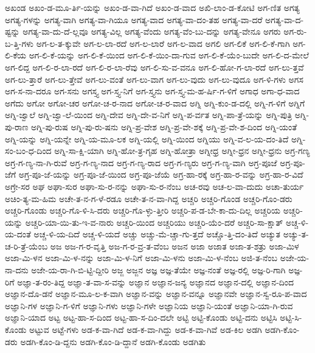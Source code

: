 {ಅಖಂಡ
ಅಖಂ-ಡ-ಮೂ-ರ್ತಿ-ಯನ್ನು
ಅಖಂ-ಡ-ವಾ-ಗಿದೆ
ಅಖಂ-ಡ-ವಾದ
ಅಖಿ-ಲಾಂ-ಡ-ಕೋಟಿ
ಅಗ-ಣಿತ
ಅಗತ್ಯ
ಅಗತ್ಯ-ಗಳನ್ನು
ಅಗತ್ಯ-ವಾಗಿ
ಅಗತ್ಯ-ವಾ-ಗಿಯೂ
ಅಗತ್ಯ-ವಾದ
ಅಗತ್ಯ-ವಾ-ದಂ-ತಹ
ಅಗತ್ಯ-ವಾ-ದರೆ
ಅಗತ್ಯ-ವಾ-ದ-ಷ್ಟನ್ನು
ಅಗತ್ಯ-ವಾ-ದು-ದೆ-ಲ್ಲವೂ
ಅಗತ್ಯ-ವಿಲ್ಲ
ಅಗತ್ಯ-ವೆಂದು
ಅಗತ್ಯ-ವೆಂ-ಬು-ದನ್ನು
ಅಗತ್ಯ-ವೇನೂ
ಅಗರು
ಅಗ-ರು-ಬ-ತ್ತಿ-ಗಳು
ಅಗ-ಲ-ತ-ಕ್ಕುವೇ
ಅಗ-ಲ-ಲಾ-ರದೆ
ಅಗ-ಲ-ಲಾರೆ
ಅಗ-ಲ-ವಾದ
ಅಗಲಿ
ಅಗ-ಲಿಕೆ
ಅಗ-ಲಿ-ಕೆ-ಗಾಗಿ
ಅಗ-ಲಿ-ಕೆಯ
ಅಗ-ಲಿ-ಕೆ-ಯನ್ನು
ಅಗ-ಲಿ-ಕೆ-ಯಿಂದ
ಅಗ-ಲಿ-ಕೆ-ಯಿಂ-ದಾ-ಗುವ
ಅಗ-ಲಿ-ಕೆ-ಯೆಂ-ಬುದೇ
ಅಗ-ಲಿ-ದ-ಮೇಲೆ
ಅಗ-ಲಿದ್ದ
ಅಗ-ಲಿ-ರ-ಲಾ-ರದೆ
ಅಗ-ಲಿ-ರ-ಲಾ-ರೆವು
ಅಗ-ಲಿ-ಸು-ವ-ವನೂ
ಅಗ-ಲಿ-ಹೋ-ಗ-ಲಾ-ರದೆ
ಅಗ-ಲು-ತ್ತವೆ
ಅಗ-ಲು-ತ್ತಾರೆ
ಅಗ-ಲು-ತ್ತೇವೆ
ಅಗ-ಲು-ವಂತೆ
ಅಗ-ಲು-ವಾಗ
ಅಗ-ಲು-ವುದು
ಅಗ-ಲು-ವುದೂ
ಅಗ-ಳಿ-ಗಳು
ಅಗಸ
ಅಗ-ಸ-ನಾ-ದರೂ
ಅಗ-ಸನು
ಅಗಸ್ತ್ಯ
ಅಗ-ಸ್ತ್ಯ-ನಿಗೆ
ಅಗ-ಸ್ತ್ಯನು
ಅಗ-ಸ್ತ್ಯ-ಮ-ಹ-ರ್ಷಿ-ಗ-ಳಿಗೆ
ಅಗಾಧ
ಅಗಾ-ಧ-ವಾದ
ಅಗೆದು
ಅಗೋ
ಅಗೋ-ಚರ
ಅಗೋ-ಚ-ರ-ನಾದ
ಅಗೋ-ಚ-ರ-ವಾದ
ಅಗ್ನಿ
ಅಗ್ನಿ-ಕುಂ-ಡ-ದಲ್ಲಿ
ಅಗ್ನಿ-ಗ-ಳಿಗೆ
ಅಗ್ನಿಗೆ
ಅಗ್ನಿ-ಜ್ವಾಲೆ
ಅಗ್ನಿ-ಜ್ವಾ-ಲೆ-ಯಿಂದ
ಅಗ್ನಿ-ದೇವ
ಅಗ್ನಿ-ದೇ-ವ-ನಿಗೆ
ಅಗ್ನಿ-ಪ-ರ್ವತ
ಅಗ್ನಿ-ಪಾ-ತ್ರೆ-ಯನ್ನು
ಅಗ್ನಿ-ಪುತ್ರಿ
ಅಗ್ನಿ-ಪು-ರಾಣ
ಅಗ್ನಿ-ಪು-ರುಷ
ಅಗ್ನಿ-ಪು-ರು-ಷನು
ಅಗ್ನಿ-ಪ್ರ-ವೇಶ
ಅಗ್ನಿ-ಪ್ರ-ವೇ-ಶಕ್ಕೆ
ಅಗ್ನಿ-ಪ್ರ-ವೇ-ಶ-ದಿಂದ
ಅಗ್ನಿ-ಯಂತೆ
ಅಗ್ನಿ-ಯನ್ನು
ಅಗ್ನಿ-ಯನ್ನೇ
ಅಗ್ನಿ-ಯ-ಮೂ-ಲಕ
ಅಗ್ನಿ-ಯಲ್ಲಿ
ಅಗ್ನಿ-ಯಿಂದ
ಅಗ್ನಿಯು
ಅಗ್ನಿ-ವ-ಲ-ಯ-ದಂ-ತಿದೆ
ಅಗ್ನಿ-ಸಂ-ಬಂ-ಧ-ದಿಂದ
ಅಗ್ನಿ-ಸಾ-ಕ್ಷಿ-ಯಾಗಿ
ಅಗ್ನಿ-ಹೋ-ತ್ರ-ಗೃಹ
ಅಗ್ನಿ-ಹೋತ್ರಾ
ಅಗ್ನೀಧ್ರ
ಅಗ್ನೀ-ಧ್ರನ
ಅಗ್ನೀ-ಧ್ರನು
ಅಗ್ರ-ಗಣ್ಯ
ಅಗ್ರ-ಗ-ಣ್ಯ-ನಾ-ಗಿ-ರುವೆ
ಅಗ್ರ-ಗ-ಣ್ಯ-ನಾದ
ಅಗ್ರ-ಗ-ಣ್ಯ-ರಾದ
ಅಗ್ರ-ಗ-ಣ್ಯರು
ಅಗ್ರ-ಗ-ಣ್ಯ-ವಾಗಿ
ಅಗ್ರ-ಪೂಜೆ
ಅಗ್ರ-ಪೂ-ಜೆಗೆ
ಅಗ್ರ-ಪೂ-ಜೆ-ಯನ್ನು
ಅಗ್ರ-ಪೂ-ಜೆ-ಯಿಂದ
ಅಗ್ರ-ಪೂ-ಜೆಯೆ
ಅಗ್ರ-ಹಾ-ರಕ್ಕೆ
ಅಗ್ರ-ಹಾ-ರ-ವನ್ನು
ಅಗ್ರ-ಹಾ-ರ-ವಿದೆ
ಅಗ್ರೇ-ಸರ
ಅಘ
ಅಘಾ-ಸುರ
ಅಘಾ-ಸು-ರ-ನನ್ನು
ಅಘಾ-ಸು-ರ-ನೆಂಬ
ಅಚ-ರವು
ಅಚ-ಲ-ವಾ-ದುದು
ಅಚಾ-ತುರ್ಯ
ಅಚಿಂ-ತ್ಯ-ಮ-ಹಿಮ
ಅಚೇ-ತ-ನ-ಗ-ಳೆ-ರಡೂ
ಅಚೇ-ತ-ನ-ವಾ-ಗಿದ್ದ
ಅಚ್ಚರಿ
ಅಚ್ಚರಿ-ಗೊಂಡ
ಅಚ್ಚರಿ-ಗೊಂ-ಡರು
ಅಚ್ಚರಿ-ಗೊಂಡು
ಅಚ್ಚರಿ-ಗೊ-ಳಿ-ಸಿ-ದರು
ಅಚ್ಚರಿ-ಗೊ-ಳ್ಳು-ತ್ತೀರಿ
ಅಚ್ಚರಿ-ಪ-ಡ-ಬೇ-ಕಾ-ದು-ದಿಲ್ಲ
ಅಚ್ಚರಿಯ
ಅಚ್ಚರಿ-ಯನ್ನು
ಅಚ್ಚರಿ-ಯಾ-ಯಿ-ತು-ಇ-ವ-ನಾರು
ಅಚ್ಚರಿ-ಯಿಂದ
ಅಚ್ಚರಿಯು
ಅಚ್ಚರಿ-ಯೆಂ-ದರೆ
ಅಚ್ಚರಿ-ಸಾ-ಕ್ಷಾತ್
ಅಚ್ಚ-ಳಿ-ಯ-ದಂತೆ
ಅಚ್ಚ-ಳಿ-ಯ-ದಿದೆ
ಅಚ್ಚ-ಳಿ-ಯದೆ
ಅಚ್ಚು
ಅಚ್ಚು-ಮೆ-ಚ್ಚಾ-ಗು-ತ್ತದೆ
ಅಚ್ಚೊ-ತ್ತಿ-ದಂ-ತಿದೆ
ಅಚ್ಯುತ
ಅಚ್ಯು-ತ-ಚ-ರಿ-ತ್ರೆ-ಯೆಂಬ
ಅಜ
ಅಜ-ಗ-ರ-ವೃತ್ತಿ
ಅಜ-ಗ-ರ-ವ್ರ-ತ-ವೆಂಬ
ಅಜನ
ಅಜಾ
ಅಜಾತ
ಅಜಾ-ತ-ಶತ್ರು
ಅಜಾ-ಮಿಳ
ಅಜಾ-ಮಿ-ಳನ
ಅಜಾ-ಮಿ-ಳ-ನನ್ನು
ಅಜಾ-ಮಿ-ಳ-ನಿಗೆ
ಅಜಾ-ಮಿ-ಳನು
ಅಜಾ-ಮಿ-ಳ-ನೆಂಬ
ಅಜಿ-ತ-ನೆಂಬ
ಅಜೇ-ಯ-ನಾ-ದನು
ಅಜೇ-ಯ-ರಾ-ಗಿ-ಬಿ-ಟ್ಟಿ-ದ್ದೀರಿ
ಅಜ್ಜ
ಅಜ್ಜನ
ಅಜ್ಞ
ಅಜ್ಞ-ತೆಯೇ
ಅಜ್ಞ-ನಂತೆ
ಅಜ್ಞ-ರಲ್ಲಿ
ಅಜ್ಞ-ರಿ-ಗಾಗಿ
ಅಜ್ಞ-ರಿಗೆ
ಅಜ್ಞಾ-ತ-ರಂ-ತಿದ್ದ
ಅಜ್ಞಾ-ತ-ವಾ-ಸ-ವನ್ನು
ಅಜ್ಞಾನ
ಅಜ್ಞಾನ-ಜನ್ಯ
ಅಜ್ಞಾನದ
ಅಜ್ಞಾನ-ದಲ್ಲಿ
ಅಜ್ಞಾನ-ದಿಂದ
ಅಜ್ಞಾನ-ದೊ-ಡನೆ
ಅಜ್ಞಾನ-ಮೂ-ಲ-ಕ-ವಾಗಿ
ಅಜ್ಞಾನ-ವನ್ನು
ಅಜ್ಞಾನ-ವನ್ನೂ
ಅಜ್ಞಾನವೇ
ಅಜ್ಞಾನ-ಸ್ವ-ರೂ-ಪ-ವಾದ
ಅಜ್ಞಾನಿ-ಗಳ
ಅಜ್ಞಾನಿ-ಗ-ಳಿಗೆ
ಅಜ್ಞಾನಿ-ಗಳು
ಅಜ್ಞಾನಿ-ಗಳೇ
ಅಜ್ಞಾನಿಯ
ಅಜ್ಞಾನಿ-ಯಂತೆ
ಅಜ್ಞಾನಿ-ಯಾ-ಗಿ-ರುವ
ಅಜ್ಞಾನಿ-ಯಾದ
ಅಟ್ಟ
ಅಟ್ಟ-ಹಾ-ಸ-ದಿಂದ
ಅಟ್ಟ-ಹಾ-ಸ-ದಿಂ-ದಲೇ
ಅಟ್ಟಿ
ಅಟ್ಟಿ-ಕೊಂಡು
ಅಟ್ಟಿ-ದನು
ಅಟ್ಟಿಸಿ
ಅಟ್ಟಿ-ಸಿ-ಕೊಂಡು
ಅಟ್ಟುವ
ಅಟ್ಟೆ-ಗಳು
ಅಡ-ಕ-ವಾ-ಗಿದೆ
ಅಡ-ಕ-ವಾ-ಗಿದ್ದು
ಅಡ-ಕ-ವಾ-ಗಿವೆ
ಅಡ-ಕಿಲ
ಅಡಗಿ
ಅಡಗಿ-ಕೊಂ-ಡರು
ಅಡಗಿ-ಕೊಂ-ಡಿ-ದ್ದನು
ಅಡಗಿ-ಕೊಂ-ಡಿ-ದ್ದಾನೆ
ಅಡಗಿ-ಕೊಂಡು
ಅಡಗಿತು
}
